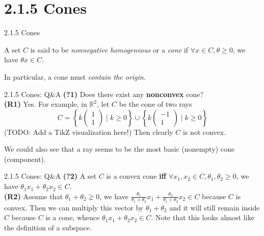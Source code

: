 \documentclass{beamer}
\begin{document}
\section{2.1.5 Cones}
\begin{frame}{2.1.5 Cones}
  \begin{definition}
    A set $C$ is said to be \textit{nonnegative homogeneous} or a \textit{cone} if $\forall x \in C, \theta \ge 0$, we
    have $\theta x \in C$.
  \end{definition}

  \vspace{7pt}
  In particular, a cone must \textit{contain the origin}.

\end{frame}


\begin{frame}{2.1.5 Cones: Q\&A}
  \textbf{(?1)} Does there exist any \textbf{nonconvex} cone?\\
  \textbf{(R1)} Yes. For example, in $\mathbb{R}^{2}$, let $C$ be the cone of two rays
  $$
    C = \left\{k\begin{pmatrix} 1\\1 \end{pmatrix}\;|\; k \ge 0 \right\}
        \cup \left\{k\begin{pmatrix} -1\\1 \end{pmatrix}\;|\; k \ge 0 \right\}
  $$
  (TODO: Add a TikZ visualization here!)
  Then clearly $C$ is not convex.

  We could also see that a ray seems to be the most basic (nonempty) cone (component).
\end{frame}


\begin{frame}{2.1.5 Cones: Q\&A}
  \textbf{(?2)} A set $C$ is a convex cone \textbf{iff} $\forall x_{1}, x_{2} \in C, \theta_{1}, \theta_{2} \ge 0$, we have
  $\theta_{1}x_{1} + \theta_{2}x_{2} \in C$.\\
  \textbf{(R2)} Assume that $\theta_{1} + \theta_{2} \gneq 0$, we have
  $
    \frac{\theta_{1}}{\theta_{1} + \theta_{2}} x_{1}
    + \frac{\theta_{2}}{\theta_{1} + \theta_{2}} x_{2} \in C
  $ because $C$ is convex. Then we can multiply this vector by $\theta_{1} + \theta_{2}$ and
  it will still remain inside $C$ because $C$ is a cone, whence $\theta_{1}x_{1} + \theta_{2}x_{2} \in C.$
  Note that this looks almost like the definition of a subspace.
\end{frame}
\end{document}
